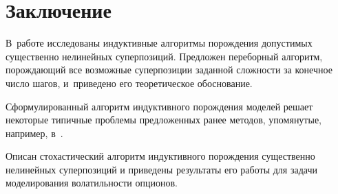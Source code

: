 \documentclass[12pt,a4paper]{article}
\begin{document}
\section{Заключение}

В~работе исследованы индуктивные алгоритмы порождения допустимых существенно
нелинейных суперпозиций. Предложен переборный алгоритм, порождающий все
возможные суперпозиции заданной сложности за конечное число шагов, и~приведено
его теоретическое обоснование.

Сформулированный алгоритм индуктивного порождения моделей решает некоторые
типичные проблемы предложенных ранее методов, упомянутые, например, в~\cite{Zelinka2008}.

Описан стохастический алгоритм индуктивного порождения существенно нелинейных
суперпозиций и приведены результаты его работы для задачи моделирования
волатильности опционов.

\FloatBarrier


\extrasrussian

\end{document}
